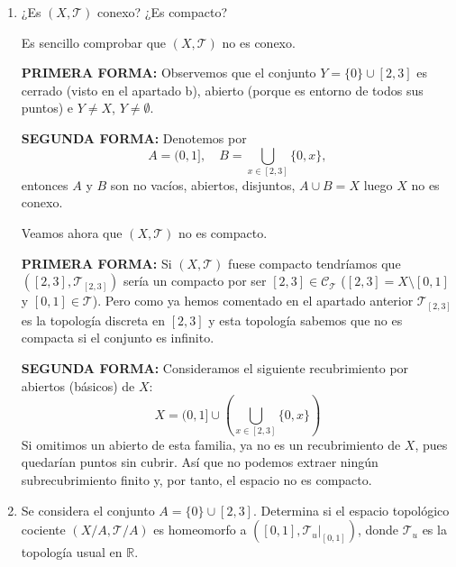 \documentclass[12pt]{article}
\begin{document}
\begin{ejercicio}
\begin{enumerate}[label=\alph*)]
                Veamos ahora que $(X,\mathcal{T})$ no es 2AN. Si $(X,\mathcal{T})$ fuese 2AN tendríamos que $([2,3],\mathcal{T}_{[2,3]})$ sería 2AN por ser esta una propiedad hereditaria. Pero $\mathcal{T}_{[2,3]}$ es la topología discreta en $[2,3]$ y esta topología sabemos que no es 2AN si el conjunto no es numerable.
            
            \item ¿Es $(X, \mathcal{T})$ conexo? ¿Es compacto?

                Es sencillo comprobar que $(X,\mathcal{T})$ no es conexo.

                \textbf{PRIMERA FORMA:} Observemos que el conjunto $Y=\{0\}\cup[2,3]$ es cerrado (visto en el apartado b), abierto (porque es entorno de todos sus puntos) e $Y\ne X$, $Y\ne\emptyset$.
        
                \textbf{SEGUNDA FORMA:} Denotemos por
                \[
                A=(0,1], \quad B=\bigcup_{x\in[2,3]}\{0,x\},
                \]
                entonces $A$ y $B$ son no vacíos, abiertos, disjuntos, $A\cup B=X$ luego $X$ no es conexo.
        
                Veamos ahora que $(X,\mathcal{T})$ no es compacto.
        
                \textbf{PRIMERA FORMA:} Si $(X,\mathcal{T})$ fuese compacto tendríamos que $([2,3],\mathcal{T}_{[2,3]})$ sería un compacto por ser $[2,3]\in\mathcal{C}_{\mathcal{T}}$ ($[2,3]=X\setminus[0,1]$ y $[0,1]\in\mathcal{T}$). Pero como ya hemos comentado en el apartado anterior $\mathcal{T}_{[2,3]}$ es la topología discreta en $[2,3]$ y esta topología sabemos que no es compacta si el conjunto es infinito.
        
                \textbf{SEGUNDA FORMA:} Consideramos el siguiente recubrimiento por abiertos (básicos) de $X$:
                \[
                X=(0,1]\cup\left(\bigcup_{x\in[2,3]}\{0,x\}\right)
                \]
                Si omitimos un abierto de esta familia, ya no es un recubrimiento de $X$, pues quedarían puntos sin cubrir. Así que no podemos extraer ningún subrecubrimiento finito y, por tanto, el espacio no es compacto.
        
            \item Se considera el conjunto $A = \{0\} \cup \left[2, 3\right]$. Determina si el espacio topológico cociente $(X/A, \mathcal{T}/A)$ es homeomorfo a $\left(\left[0, 1\right], \mathcal{T}_u|_{\left[0, 1\right]}\right)$, donde $\mathcal{T}_u$ es la topología usual en $\mathbb{R}$.


\end{enumerate}
\end{ejercicio}
\end{document}
